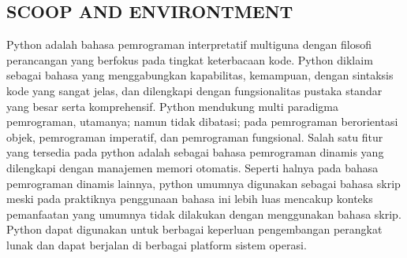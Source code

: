 \documentclass{article}
\begin{document}
\subsection{SCOOP AND ENVIRONTMENT}
Python adalah bahasa pemrograman interpretatif multiguna dengan filosofi perancangan yang berfokus pada tingkat keterbacaan kode. Python diklaim sebagai bahasa yang menggabungkan kapabilitas, kemampuan, dengan sintaksis kode yang sangat jelas, dan dilengkapi dengan fungsionalitas pustaka standar yang besar serta komprehensif. Python mendukung multi paradigma pemrograman, utamanya; namun tidak dibatasi; pada pemrograman berorientasi objek, pemrograman imperatif, dan pemrograman fungsional. Salah satu fitur yang tersedia pada python adalah sebagai bahasa pemrograman dinamis yang dilengkapi dengan manajemen memori otomatis. Seperti halnya pada bahasa pemrograman dinamis lainnya, python umumnya digunakan sebagai bahasa skrip meski pada praktiknya penggunaan bahasa ini lebih luas mencakup konteks pemanfaatan yang umumnya tidak dilakukan dengan menggunakan bahasa skrip. Python dapat digunakan untuk berbagai keperluan pengembangan perangkat lunak dan dapat berjalan di berbagai platform sistem operasi.
\end{document}
